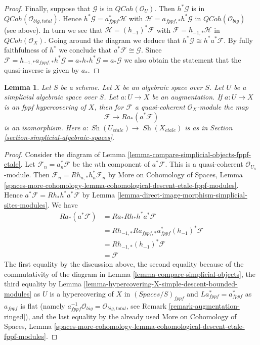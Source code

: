 \documentclass{stacks-project}
\theoremstyle{plain}
\newtheorem{lemma}[subsection]{Lemma}
\theoremstyle{definition}
\theoremstyle{remark}
\numberwithin{equation}{subsection}
\def\Sh{\mathop{\mathit{Sh}}\nolimits}
\def\etale{{\acute{e}tale}}
\def\QCoh{\mathit{QCoh}}
\begin{document}
\begin{proof}
\medskip\noindent
Finally, suppose that $\mathcal{G}$ is in $\QCoh(\mathcal{O}_U)$.
Then $h^*\mathcal{G}$ is in $\QCoh(\mathcal{O}_{big, total})$.
Hence $h^*\mathcal{G} = a_{fppf}^*\mathcal{H}$ with
$\mathcal{H} = a_{fppf, *}h^*\mathcal{G}$
in $\QCoh(\mathcal{O}_{big})$ (see above).
In turn we see that $\mathcal{H} = (h_{-1})^*\mathcal{F}$
with $\mathcal{F} = h_{-1, *}\mathcal{H}$ in $\QCoh(\mathcal{O}_X)$.
Going around the diagram we deduce that
$h^*\mathcal{G} \cong h^*a^*\mathcal{F}$.
By fully faithfulness of $h^*$ we conclude that
$a^*\mathcal{F} \cong \mathcal{G}$.
Since $\mathcal{F} = h_{-1, *}a_{fppf, *}h^*\mathcal{G} =
a_*h_*h^*\mathcal{G} = a_*\mathcal{G}$ we also obtain
the statement that the quasi-inverse is given by $a_*$.
\end{proof}

\begin{lemma}
\label{lemma-cohomological-descent-qcoh-for-fppf-hypercovering}
Let $S$ be a scheme. Let $X$ be an algebraic space over $S$.
Let $U$ be a simplicial algebraic space over $S$. Let $a : U \to X$
be an augmentation. If $a : U \to X$ is an fppf hypercovering of $X$,
then for $\mathcal{F}$ a quasi-coherent $\mathcal{O}_X$-module
the map
$$
\mathcal{F} \to Ra_*(a^*\mathcal{F})
$$
is an isomorphism. Here $a : \Sh(U_\etale) \to \Sh(X_\etale)$
is as in Section \ref{section-simplicial-algebraic-spaces}.
\end{lemma}

\begin{proof}
Consider the diagram of Lemma \ref{lemma-compare-simplicial-objects-fppf-etale}.
Let $\mathcal{F}_n = a_n^*\mathcal{F}$ be the $n$th component of
$a^*\mathcal{F}$. This is a quasi-coherent $\mathcal{O}_{U_n}$-module.
Then $\mathcal{F}_n = Rh_{n, *}h_n^*\mathcal{F}_n$
by More on Cohomology of Spaces, Lemma
\ref{spaces-more-cohomology-lemma-cohomological-descent-etale-fppf-modules}.
Hence $a^*\mathcal{F} = Rh_*h^*a^*\mathcal{F}$ by
Lemma \ref{lemma-direct-image-morphism-simplicial-sites-modules}.
We have
\begin{align*}
Ra_*(a^*\mathcal{F})
& =
Ra_*Rh_*h^*a^*\mathcal{F} \\
& =
Rh_{-1, *}Ra_{fppf, *}a_{fppf}^*(h_{-1})^*\mathcal{F} \\
& =
Rh_{-1, *}(h_{-1})^*\mathcal{F} \\
& =
\mathcal{F}
\end{align*}
The first equality by the discussion above, the second equality
because of the commutativity of the diagram in
Lemma \ref{lemma-compare-simplicial-objects}, the third equality by
Lemma \ref{lemma-hypercovering-X-simple-descent-bounded-modules}
as $U$ is a hypercovering of $X$ in $(\textit{Spaces}/S)_{fppf}$
and $La_{fppf}^* = a_{fppf}^*$ as $a_{fppf}$ is flat
(namely $a_{fppf}^{-1}\mathcal{O}_{big} = \mathcal{O}_{big, total}$,
see Remark \ref{remark-augmentation-ringed}), and
the last equality by the already used
More on Cohomology of Spaces, Lemma
\ref{spaces-more-cohomology-lemma-cohomological-descent-etale-fppf-modules}.
\end{proof}
\end{document}
